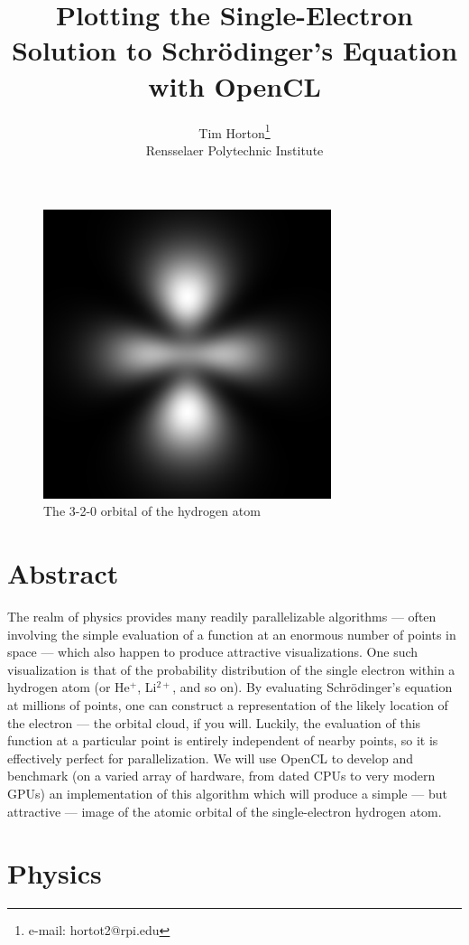 \documentclass{acmsiggraph}
\title{\Large Plotting the Single-Electron Solution to Schr\"{o}dinger's Equation with OpenCL}
\author{Tim Horton\thanks{e-mail: hortot2@rpi.edu}\\Rensselaer Polytechnic Institute}
\begin{document}
\maketitle

\begin{figure}
    \includegraphics[width=84.5mm]{320.png}
    \caption{The 3-2-0 orbital of the hydrogen atom}
\end{figure}

\section{Abstract}

The realm of physics provides many readily parallelizable algorithms --- often involving the simple evaluation of a function at an enormous number of points in space --- which also happen to produce attractive visualizations. One such visualization is that of the probability distribution of the single electron within a hydrogen atom (or He$^+$, Li$^{2+}$, and so on). By evaluating Schr\"{o}dinger's equation at millions of points, one can construct a representation of the likely location of the electron --- the orbital cloud, if you will. Luckily, the evaluation of this function at a particular point is entirely independent of nearby points, so it is effectively perfect for parallelization. We will use OpenCL to develop and benchmark (on a varied array of hardware, from dated CPUs to very modern GPUs) an implementation of this algorithm which will produce a simple --- but attractive --- image of the atomic orbital of the single-electron hydrogen atom.

\section{Physics}
\end{document}

